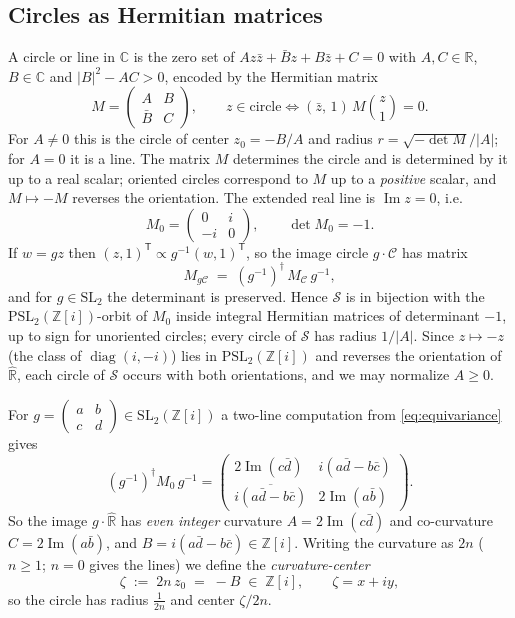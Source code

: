 \documentclass[11pt]{amsart}
\numberwithin{equation}{section}
\theoremstyle{plain}
\theoremstyle{definition}
\theoremstyle{remark}
\newcommand{\C}{\mathbb{C}}
\newcommand{\R}{\mathbb{R}}
\newcommand{\Z}{\mathbb{Z}}
\newcommand{\Zi}{\Z[i]}
\newcommand{\Rhat}{\widehat{\R}}
\newcommand{\SL}{\mathrm{SL}}
\newcommand{\PSL}{\mathrm{PSL}}
\newcommand{\im}{\operatorname{Im}}
\newcommand{\Sarr}{\mathcal{S}}
\begin{document}
\subsection{Circles as Hermitian matrices}\label{subsec:hermitian}

A circle or line in $\C$ is the zero set of
$A z\bar z + \bar B z + B\bar z + C = 0$ with $A, C \in \R$, $B \in \C$
and $|B|^2 - AC > 0$, encoded by the Hermitian matrix
\[
  M = \begin{pmatrix} A & B \\ \bar B & C \end{pmatrix},
  \qquad
  z \in \text{circle} \iff (\bar z,\, 1)\, M \binom{z}{1} = 0 .
\]
For $A \neq 0$ this is the circle of center $z_0 = -B/A$ and radius
$r = \sqrt{-\det M}/|A|$; for $A = 0$ it is a line.  The matrix $M$
determines the circle and is determined by it up to a real scalar;
oriented circles correspond to $M$ up to a \emph{positive} scalar, and
$M \mapsto -M$ reverses the orientation.  The extended real line is
$\im z = 0$, i.e.
\begin{equation}\label{eq:M0}
  M_0 = \begin{pmatrix} 0 & i \\ -i & 0\end{pmatrix},
  \qquad \det M_0 = -1 .
\end{equation}
If $w = gz$ then $(z, 1)^{\mathsf T} \propto g^{-1}(w, 1)^{\mathsf T}$, so
the image circle $g\cdot\mathcal{C}$ has matrix
\begin{equation}\label{eq:equivariance}
  M_{g\mathcal{C}} \;=\; (g^{-1})^{\dagger}\, M_{\mathcal{C}}\, g^{-1},
\end{equation}
and for $g \in \SL_2$ the determinant is preserved.  Hence $\Sarr$ is in
bijection with the $\PSL_2(\Zi)$-orbit of $M_0$ inside integral Hermitian
matrices of determinant $-1$, up to sign for unoriented circles; every
circle of $\Sarr$ has radius $1/|A|$.  Since $z \mapsto -z$ (the class of
$\operatorname{diag}(i, -i)$) lies in $\PSL_2(\Zi)$ and reverses the
orientation of $\Rhat$, each circle of $\Sarr$ occurs with both
orientations, and we may normalize $A \ge 0$.

For $g = \begin{pmatrix} a & b \\ c & d\end{pmatrix} \in \SL_2(\Zi)$ a
two-line computation from \eqref{eq:equivariance} gives
\begin{equation}\label{eq:image}
  (g^{-1})^{\dagger} M_0\, g^{-1}
  = \begin{pmatrix}
    2\im(c\bar d) & i(a\bar d - b\bar c) \\
    \overline{i(a\bar d - b\bar c)} & 2\im(a\bar b)
  \end{pmatrix}.
\end{equation}
So the image $g \cdot \Rhat$ has \emph{even integer} curvature
$A = 2\im(c\bar d)$ and co-curvature $C = 2\im(a\bar b)$, and
$B = i(a\bar d - b\bar c) \in \Zi$.  Writing the curvature as $2n$
($n \ge 1$; $n = 0$ gives the lines) we define the
\emph{curvature-center}
\[
  \zeta \;:=\; 2n\,z_0 \;=\; -B \;\in\; \Zi, \qquad \zeta = x + iy,
\]
so the circle has radius $\tfrac{1}{2n}$ and center $\zeta/2n$.
\end{document}

